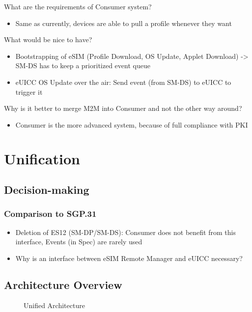 What are the requirements of Consumer system?
\begin{itemize}
    \item Same as currently, devices are able to pull a profile whenever they want
\end{itemize}
What would be nice to have?
\begin{itemize}
    \item Bootstrapping of eSIM (Profile Download, OS Update, Applet Download) -> SM-DS has to keep a prioritized event queue 
\item eUICC OS Update over the air: Send event (from SM-DS) to eUICC to trigger it
\end{itemize}
Why is it better to merge M2M into Consumer and not the other way around?
\begin{itemize}
    \item Consumer is the more advanced system, because of full compliance with PKI 
\end{itemize}



\section{Unification}
\subsection{Decision-making}
\subsubsection{Comparison to SGP.31}
\begin{itemize}
    \item Deletion of ES12 (SM-DP/SM-DS): Consumer does not benefit from this interface, Events (in Spec) are rarely used 
    \item Why is an interface between eSIM Remote Manager and eUICC necessary?
\end{itemize}
\subsection{Architecture Overview}
\begin{figure}[ht]
    \centering
    
    \caption{Unified Architecture}
    \label{fig:uni_arch}
\end{figure}

